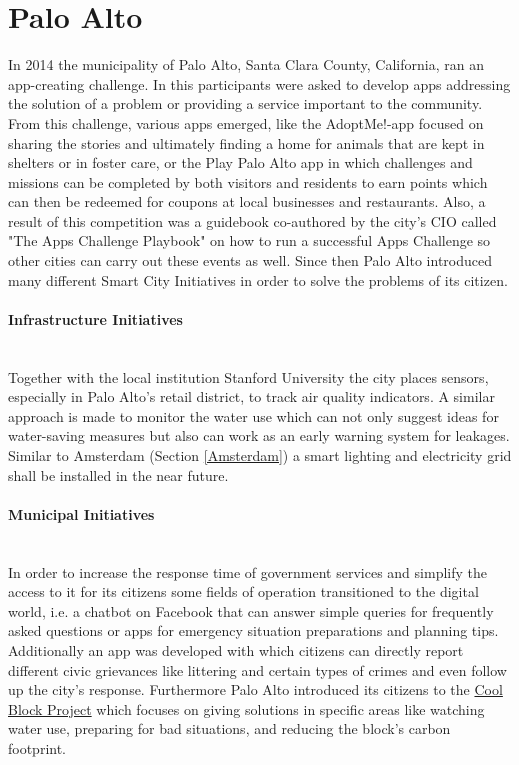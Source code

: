 \documentclass[a4paper,12pt]{report}
\begin{document}
	\section[Palo Alto]{Palo Alto \cite{SmartCityPaloAlto}}
	\startsection
		In 2014 the municipality of Palo Alto, Santa Clara County, California, ran an app-creating challenge. In this participants were asked to develop apps addressing the solution of a problem or providing a service important to the community. From this challenge, various apps emerged, like the AdoptMe!-app focused on sharing the stories and ultimately finding a home for animals that are kept in shelters or in foster care, or the Play Palo Alto app in which challenges and missions can be completed by both visitors and residents to earn points which can then be redeemed for coupons at local businesses and restaurants. Also, a result of this competition was a guidebook co-authored by the city's CIO called "The Apps Challenge Playbook" \cite{AppsChallengePlaybook} on how to run a successful Apps Challenge so other cities can carry out these events as well. Since then Palo Alto introduced many different Smart City Initiatives in order to solve the problems of its citizen.
		\paragraph{Infrastructure Initiatives} \hfill \\
		Together with the local institution Stanford University the city places sensors, especially in Palo Alto's retail district, to track air quality indicators. A similar approach is made to monitor the water use which can not only suggest ideas for water-saving measures but also can work as an early warning system for leakages. Similar to Amsterdam (Section \ref{Amsterdam}) a smart lighting and electricity grid shall be installed in the near future.
		\paragraph{Municipal Initiatives} \hfill \\
		In order to increase the response time of government services and simplify the access to it for its citizens some fields of operation transitioned to the digital world, i.e. a chatbot on Facebook that can answer simple queries for frequently asked questions or apps for emergency situation preparations and planning tips. Additionally an app was developed with which citizens can directly report different civic grievances like littering and certain types of crimes and even follow up the city's response. Furthermore Palo Alto introduced its citizens to the \href{https://coolblock.org/}{Cool Block Project} which focuses on giving solutions in specific areas like watching water use, preparing for bad situations, and reducing the block's carbon footprint.	
\end{document}
